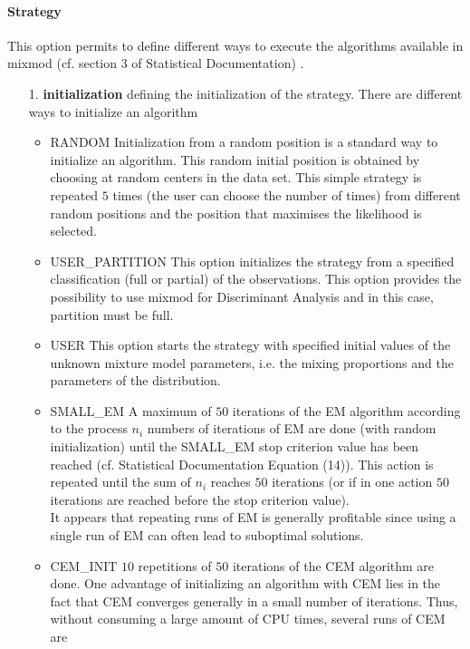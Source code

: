 \paragraph{Strategy}
This option permits to define different ways to execute the algorithms available in {\sc mixmod}
(cf. section 3 of Statistical Documentation) .\\

\begin{itemize}
 \item[1.] {\bf initialization} defining the initialization of the strategy.
           There are different ways to initialize an algorithm
           \begin{itemize}
            \item RANDOM Initialization from a random position is a standard way to
initialize an algorithm. This random initial position is obtained by
choosing at random centers in the data set. This simple strategy is
repeated $5$ times (the user can choose the number of times) from
different random positions and the position that maximises the
likelihood is selected.
             \item USER\_PARTITION This option initializes the strategy from a
specified classification (full or partial) of the observations.
This option provides the possibility to use {\sc mixmod} for
Discriminant Analysis and in this case, partition must be full.
             \item USER This option starts the strategy with specified initial values
of the unknown mixture model parameters, i.e. the mixing
proportions and the parameters of the distribution.
             \item SMALL\_EM A maximum of $50$ iterations of the EM algorithm according to the process $n_i$ numbers of iterations
of EM are done (with random initialization) until the SMALL\_EM stop criterion value has been reached
 (cf. Statistical Documentation Equation (14)). This action is repeated until the sum of $n_i$
reaches $50$ iterations (or if in one action $50$ iterations are reached before the stop criterion value).\\
It appears that repeating runs of EM is generally profitable since using a single run
of EM can often lead to suboptimal solutions.
             \item CEM\_INIT  $10$ repetitions of $50$ iterations of the CEM algorithm are done.
One advantage of initializing an algorithm with CEM lies in the fact
that CEM converges generally in a small number of iterations. Thus,
without consuming a large amount of CPU times, several runs of CEM are

\end{itemize}
\end{itemize}
